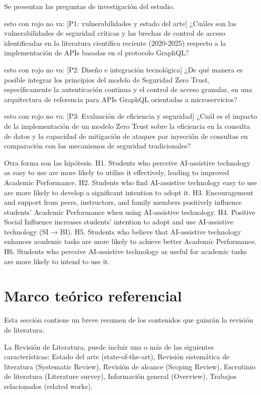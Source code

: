\documentclass[12pt]{article}
\begin{document}
Se presentan las preguntas de investigación del estudio.

{\color{red} esto con rojo no va: [P1: vulnerabilidades y estado del arte]}
¿Cuáles son las vulnerabilidades de seguridad críticas y las brechas de control de acceso identificadas en la literatura científica reciente (2020-2025) respecto a la implementación de APIs basadas en el protocolo GraphQL?

{\color{red} esto con rojo no va: [P2: Diseño e integración tecnológica]}
¿De qué manera es posible integrar los principios del modelo de Seguridad Zero Trust, específicamente la autenticación continua y el control de acceso granular, en una arquitectura de referencia para APIs GraphQL orientadas a microservicios?

{\color{red} esto con rojo no va: [P3: Evaluación de eficiencia y seguridad]}
¿Cuál es el impacto de la implementación de un modelo Zero Trust sobre la eficiencia en la consulta de datos y la capacidad de mitigación de ataques por inyección de consultas en comparación con los mecanismos de seguridad tradicionales?

Otra forma son las hipótesis.
H1.  Students who perceive AI-assistive technology as easy to use are more likely to utilize it effectively, leading to improved Academic Performance.
H2.  Students who find AI-assistive technology easy to use are more likely to develop a significant intention to adopt it.
H3.  Encouragement and support from peers, instructors, and family members positively influence students’ Academic Performance when using AI-assistive technology.
H4.  Positive Social Influence increases students’ intention to adopt and use AI-assistive technology (SI → BI).
H5.  Students who believe that AI-assistive technology enhances academic tasks are more likely to achieve better Academic Performance.
H6.  Students who perceive AI-assistive technology as useful for academic tasks are more likely to intend to use it.

\section{Marco teórico referencial}
{\color{magenta}Esta sección contiene un breve resumen de los contenidos que guiarán la revisión de literatura.

La Revisión de Literatura, puede incluir una o más de las siguientes características: Estado del arte (state-of-the-art), Revisión sistemática de literatura (Systematic Review), Revisión de alcance (Scoping Review),
Escrutinio de literatura (Literature survey), Información general (Overview), Trabajos relacionados (related works).}
\end{document}

